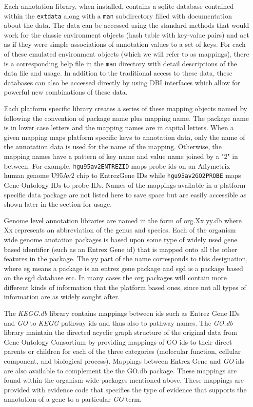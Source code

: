 \documentclass{article}
\newcommand{\Robject}[1]{{\texttt{#1}}}
\newcommand{\Rpackage}[1]{{\textit{#1}}}
\begin{document}
Each annotation library, when installed, contains a sqlite database contained
within the \texttt{extdata} along with a \texttt{man} subdirectory filled with
documentation about the data. The data can be accessed using the standard
methods that would work for the classic environment objects (hash table with
key-value pairs) and act as if they were simple associations of annotation
values to a set of keys. For each of these emulated environment objects (which
we will refer to as mappings), there is a corresponding help file in the
\texttt{man} directory with detail descriptions of the data file and usage.
In addition to the traditional access to these data, these databases can also
be accessed directly by using DBI interfaces which allow for powerful new
combinations of these data.

Each platform specific library creates a series of these mapping objects
named by following the convention of package name plus mapping
name. The package name is in lower case letters and the mapping
names are in capital letters. When a given mapping maps platform
specific keys to annotation data, only the name of the annotation data
is used for the name of the mapping. Otherwise, the mapping
names have a pattern of key name and value name joined by a "2" in
between. For example, \Robject{hgu95av2ENTREZID} maps probe ids on 
an Affymetrix human genome U95Av2 chip to EntrezGene IDs while \Robject{hgu95av2GO2PROBE} 
maps Gene Ontology IDs to probe IDs. Names of the mappings available in a
platform specific data package are not listed here to save space but
are easily accessible as shown later in the section for usage.


Genome level annotation libraries are named in the form of org.Xx.yy.db where
Xx represents an abbreviation of the genus and species. Each of the organism
wide genome anotation packages is based upon some type of widely used gene
based identifier (such as an Entrez Gene id) that is mapped onto all the other
features in the package.  The yy part of the name corresponds to this
designation, where eg means a package is an entrez gene package and sgd is a
package based on the sgd database etc.  In many cases the org packages will
contain more different kinds of information that the platform based ones,
since not all types of information are as widely sought after.


The \Rpackage{KEGG.db} library contains mappings between ids such as Entrez
Gene IDs and \Rpackage{GO} to \Rpackage{KEGG} pathway ids and thus also to
pathway names.  The \Rpackage{GO.db} library maintain the directed acyclic
graph structure of the original data from Gene Ontology Consortium by
providing mappings of GO ids to their direct parents or children for each of
the three categories (molecular function, cellular component, and biological
process). Mappings between Entrez Gene and \Rpackage{GO} ids are also
available to complement the the GO.db package. These mappings are found within
the organism wide packages mentioned above. These mappings are provided with
evidence code that specifies the type of evidence that supports the annotation
of a gene to a particular \Rpackage{GO} term.
\end{document}
